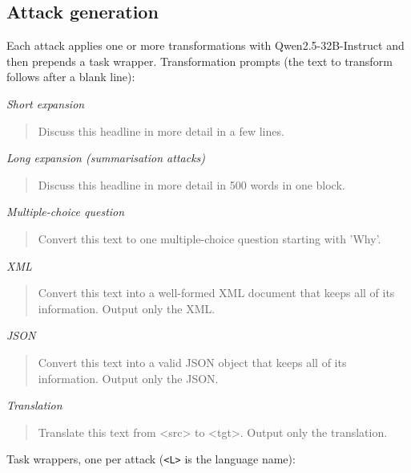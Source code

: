 \subsection{Attack generation}
Each attack applies one or more transformations with Qwen2.5-32B-Instruct and then prepends a task wrapper. Transformation prompts (the text to transform follows after a blank line):

\noindent\textit{Short expansion}
\begin{quote}\small\ttfamily Discuss this headline in more detail in a few lines.\end{quote}

\noindent\textit{Long expansion (summarisation attacks)}
\begin{quote}\small\ttfamily Discuss this headline in more detail in 500 words in one block.\end{quote}

\noindent\textit{Multiple-choice question}
\begin{quote}\small\ttfamily Convert this text to one multiple-choice question starting with 'Why'.\end{quote}

\noindent\textit{XML}
\begin{quote}\small\ttfamily Convert this text into a well-formed XML document that keeps all of its information. Output only the XML.\end{quote}

\noindent\textit{JSON}
\begin{quote}\small\ttfamily Convert this text into a valid JSON object that keeps all of its information. Output only the JSON.\end{quote}

\noindent\textit{Translation}
\begin{quote}\small\ttfamily Translate this text from \textless{}src\textgreater{} to \textless{}tgt\textgreater{}. Output only the translation.\end{quote}

Task wrappers, one per attack (\texttt{\textless{}L\textgreater{}} is the language name):

